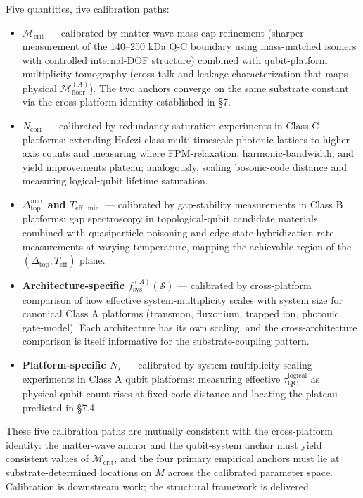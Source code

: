 \documentclass[
  11pt,
  a4paper,
]{article}
\providecommand{\tightlist}{%
  \setlength{\itemsep}{0pt}\setlength{\parskip}{0pt}}
\begin{document}
Five quantities, five calibration paths:

\begin{itemize}
\tightlist
\item
  \textbf{\(\mathcal{M}_{\mathrm{crit}}\)} --- calibrated by matter-wave
  mass-cap refinement (sharper measurement of the 140--250 kDa Q-C
  boundary using mass-matched isomers with controlled internal-DOF
  structure) combined with qubit-platform multiplicity tomography
  (cross-talk and leakage characterization that maps physical
  \(\mathcal{M}_{\mathrm{floor}}^{(A)}\)). The two anchors converge on
  the same substrate constant via the cross-platform identity
  established in §7.
\item
  \textbf{\(N_{\mathrm{corr}}\)} --- calibrated by redundancy-saturation
  experiments in Class C platforms: extending Hafezi-class
  multi-timescale photonic lattices to higher axis counts and measuring
  where FPM-relaxation, harmonic-bandwidth, and yield improvements
  plateau; analogously, scaling bosonic-code distance and measuring
  logical-qubit lifetime saturation.
\item
  \textbf{\(\Delta_{\mathrm{top}}^{\max}\) and
  \(T_{\mathrm{eff,\min}}\)} --- calibrated by gap-stability
  measurements in Class B platforms: gap spectroscopy in
  topological-qubit candidate materials combined with
  quasiparticle-poisoning and edge-state-hybridization rate measurements
  at varying temperature, mapping the achievable region of the
  \((\Delta_{\mathrm{top}}, T_{\mathrm{eff}})\) plane.
\item
  \textbf{Architecture-specific \(f_{\mathrm{sys}}^{(A)}(\mathcal{S})\)}
  --- calibrated by cross-platform comparison of how effective
  system-multiplicity scales with system size for canonical Class A
  platforms (transmon, fluxonium, trapped ion, photonic gate-model).
  Each architecture has its own scaling, and the cross-architecture
  comparison is itself informative for the substrate-coupling pattern.
\item
  \textbf{Platform-specific \(N_\star\)} --- calibrated by
  system-multiplicity scaling experiments in Class A qubit platforms:
  measuring effective \(\tau_{\mathrm{QC}}^{\mathrm{logical}}\) as
  physical-qubit count rises at fixed code distance and locating the
  plateau predicted in §7.4.
\end{itemize}

These five calibration paths are mutually consistent with the
cross-platform identity: the matter-wave anchor and the qubit-system
anchor must yield consistent values of \(\mathcal{M}_{\mathrm{crit}}\),
and the four primary empirical anchors must lie at substrate-determined
locations on \(M\) across the calibrated parameter space. Calibration is
downstream work; the structural framework is delivered.
\end{document}
